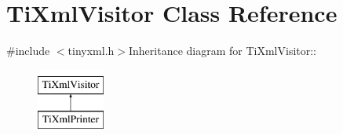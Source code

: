 \hypertarget{class_ti_xml_visitor}{
\section{TiXmlVisitor Class Reference}
\label{class_ti_xml_visitor}
}


{\ttfamily \#include $<$tinyxml.h$>$}Inheritance diagram for TiXmlVisitor::\begin{figure}[H]
\begin{center}
\leavevmode
\includegraphics[height=2cm]{class_ti_xml_visitor}
\end{center}
\end{figure}
